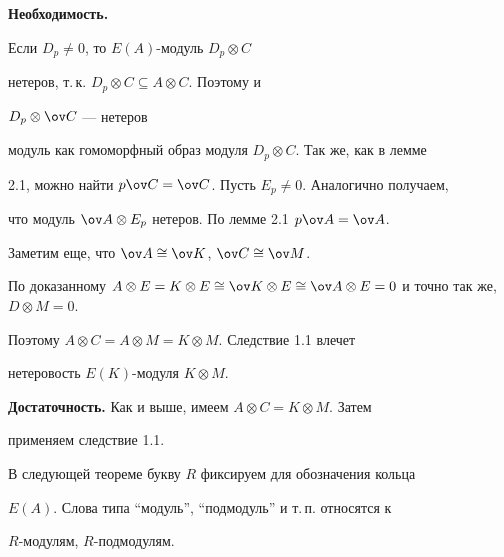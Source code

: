 \begin{pf} {\bf Необходимость.} 


Если $D_p\ne0$, то $E(A)$-модуль $D_p\otimes C$ 


нетеров, т.\,к. $D_p\otimes C\subseteq A\otimes C$. Поэтому и 


$D_p\otimes\ov C$ --- нетеров 


модуль как гомоморфный образ модуля $D_p\otimes C$. Так же, как в лемме 


2.1, можно найти $p\ov C=\ov C$. Пусть $E_p\ne0$. Аналогично получаем, 


что модуль $\ov A\otimes E_p$ нетеров. По лемме 2.1\; $p\ov A=\ov A$. 


Заметим еще, что $\ov A\cong\ov K$, $\ov C\cong\ov M$. 


По доказанному $A\otimes E=K\otimes E\cong\ov K\otimes E\cong\ov 


A\otimes E=0$ и точно так же, $D\otimes M=0$. 


Поэтому $A\otimes C=A\otimes M=K\otimes M$. Следствие 1.1 влечет 


нетеровость $E(K)$-модуля $K\otimes M$. 


 


{\bf Достаточность.} Как и выше, имеем $A\otimes C=K\otimes M$. Затем 


применяем следствие 1.1. 


\end{pf} 


 


В следующей теореме букву $R$ фиксируем для обозначения кольца 


$E(A)$. Слова типа ``модуль'', ``подмодуль'' и т.\,п. относятся к 


$R$-модулям, $R$-подмодулям. 


 


